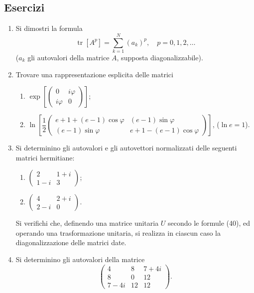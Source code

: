 \documentclass[11pt, a4paper]{book}
\numberwithin{equation}{section}
\newenvironment{esercizi}{\subsection*{Esercizi}\begin{enumerate}}{\end{enumerate}}
\begin{document}
\begin{esercizi}

\item Si dimostri la formula
\[
\operatorname{tr}[A^p] = \sum_{k=1}^{N} (a_k)^p, \quad p = 0, 1, 2,
\ldots
\]
($a_k$ gli autovalori della matrice $A$, supposta diagonalizzabile).

\item Trovare una rappresentazione esplicita delle matrici
\begin{enumerate}
  \item $\exp\!\left[\begin{pmatrix} 0 & i\varphi \\ i\varphi & 0
        \end{pmatrix}\right]$;
  \item $\ln\!\left[\dfrac{1}{2}
        \begin{pmatrix}
          e+1+(e-1)\cos\varphi & (e-1)\sin\varphi \\
          (e-1)\sin\varphi     & e+1-(e-1)\cos\varphi
        \end{pmatrix}\right]$, \quad ($\ln e = 1$).
\end{enumerate}

\item Si determinino gli autovalori e gli autovettori normalizzati delle
seguenti matrici hermitiane:
\begin{enumerate}
  \item $\begin{pmatrix} 2 & 1+i \\ 1-i & 3 \end{pmatrix}$;
  \item $\begin{pmatrix} 4 & 2+i \\ 2-i & 0 \end{pmatrix}$.
\end{enumerate}
Si verifichi che, definendo una matrice unitaria $U$ secondo le formule
(40), ed operando una trasformazione unitaria, si realizza in ciascun caso
la diagonalizzazione delle matrici date.


\item Si determinino gli autovalori della matrice
\[
\begin{pmatrix} 4 & 8 & 7+4i \\ 8 & 0 & 12 \\ 7-4i & 12 & 12
\end{pmatrix}.
\]


\end{esercizi}
\end{document}
